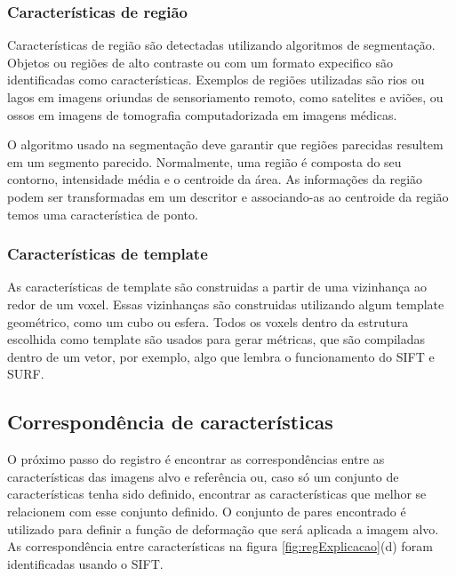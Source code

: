 \subsubsection{Características de região}

  Características de região são detectadas utilizando algoritmos de segmentação.
Objetos ou regiões de alto contraste ou com um formato expecifico são identificadas
como características. Exemplos de regiões utilizadas são rios ou lagos em imagens
oriundas de sensoriamento remoto, como satelites e aviões, ou ossos em imagens
de tomografia computadorizada em imagens médicas.

  O algoritmo usado na segmentação deve garantir que regiões parecidas resultem
em um segmento parecido. Normalmente, uma região é composta do seu contorno,
intensidade média e o centroide da área. As informações da região podem
ser transformadas em um descritor e associando-as ao centroide da região
temos uma característica de ponto.

\subsubsection{Características de template}

  As características de template são construidas a partir de uma vizinhança
ao redor de um voxel. Essas vizinhanças são construidas utilizando algum template
geométrico, como um cubo ou esfera. Todos os voxels dentro da estrutura
escolhida como template são usados para gerar métricas, que são compiladas
dentro de um vetor, por exemplo, algo que lembra o funcionamento do SIFT e SURF.

\subsection{Correspondência de características}

  O próximo passo do registro é encontrar as correspondências entre as características
das imagens alvo e referência ou, caso só um conjunto de características tenha sido
definido, encontrar as características que melhor se relacionem com esse conjunto
definido. O conjunto de pares encontrado é utilizado para definir a função de
deformação que será aplicada a imagem alvo. As correspondência entre características
na figura \ref{fig:regExplicacao}(d) foram identificadas usando o SIFT.

